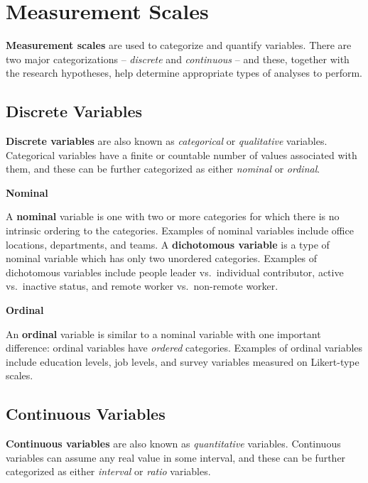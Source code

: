 \documentclass[]{book}
\begin{document}
\hypertarget{measurement-scales}{%
\section{Measurement Scales}\label{measurement-scales}}

\textbf{Measurement scales} are used to categorize and quantify variables. There are two major categorizations -- \emph{discrete} and \emph{continuous} -- and these, together with the research hypotheses, help determine appropriate types of analyses to perform.

\hypertarget{discrete-variables}{%
\subsection{Discrete Variables}\label{discrete-variables}}

\textbf{Discrete variables} are also known as \emph{categorical} or \emph{qualitative} variables. Categorical variables have a finite or countable number of values associated with them, and these can be further categorized as either \emph{nominal} or \emph{ordinal}.

\textbf{Nominal}

A \textbf{nominal} variable is one with two or more categories for which there is no intrinsic ordering to the categories. Examples of nominal variables include office locations, departments, and teams. A \textbf{dichotomous variable} is a type of nominal variable which has only two unordered categories. Examples of dichotomous variables include people leader vs.~individual contributor, active vs.~inactive status, and remote worker vs.~non-remote worker.

\textbf{Ordinal}

An \textbf{ordinal} variable is similar to a nominal variable with one important difference: ordinal variables have \emph{ordered} categories. Examples of ordinal variables include education levels, job levels, and survey variables measured on Likert-type scales.

\hypertarget{continuous-variables}{%
\subsection{Continuous Variables}\label{continuous-variables}}

\textbf{Continuous variables} are also known as \emph{quantitative} variables. Continuous variables can assume any real value in some interval, and these can be further categorized as either \emph{interval} or \emph{ratio} variables.
\end{document}
